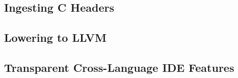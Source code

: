 \subsection{Ingesting C Headers}
\bigbreak \bigbreak \bigbreak
\bigbreak \bigbreak \bigbreak
\bigbreak \bigbreak \bigbreak
\bigbreak \bigbreak \bigbreak
\bigbreak \bigbreak \bigbreak
\bigbreak \bigbreak \bigbreak
\bigbreak \bigbreak \bigbreak
\bigbreak \bigbreak \bigbreak
\bigbreak \bigbreak \bigbreak
\bigbreak \bigbreak \bigbreak
\bigbreak \bigbreak \bigbreak
\bigbreak \bigbreak \bigbreak
\bigbreak \bigbreak \bigbreak
\bigbreak \bigbreak \bigbreak
\bigbreak \bigbreak \bigbreak
\bigbreak \bigbreak \bigbreak
\bigbreak \bigbreak \bigbreak
\bigbreak \bigbreak \bigbreak
\bigbreak \bigbreak \bigbreak
\bigbreak \bigbreak \bigbreak
\bigbreak \bigbreak \bigbreak
\bigbreak \bigbreak \bigbreak
\bigbreak \bigbreak \bigbreak
\bigbreak \bigbreak \bigbreak
\bigbreak \bigbreak \bigbreak
\bigbreak \bigbreak \bigbreak
\bigbreak \bigbreak \bigbreak
\bigbreak \bigbreak \bigbreak
\bigbreak \bigbreak \bigbreak

\subsection{Lowering to LLVM}

\bigbreak \bigbreak \bigbreak
\bigbreak \bigbreak \bigbreak
\bigbreak \bigbreak \bigbreak
\bigbreak \bigbreak \bigbreak
\bigbreak \bigbreak \bigbreak
\bigbreak \bigbreak \bigbreak
\bigbreak \bigbreak \bigbreak
\bigbreak \bigbreak \bigbreak
\bigbreak \bigbreak \bigbreak
\bigbreak \bigbreak \bigbreak
\bigbreak \bigbreak \bigbreak
\bigbreak \bigbreak \bigbreak
\bigbreak \bigbreak \bigbreak
\bigbreak \bigbreak \bigbreak
\bigbreak \bigbreak \bigbreak
\bigbreak \bigbreak \bigbreak
\bigbreak \bigbreak \bigbreak
\bigbreak \bigbreak \bigbreak
\bigbreak \bigbreak \bigbreak
\bigbreak \bigbreak \bigbreak
\bigbreak \bigbreak \bigbreak
\bigbreak \bigbreak \bigbreak
\bigbreak \bigbreak \bigbreak
\bigbreak \bigbreak \bigbreak
\bigbreak \bigbreak \bigbreak
\bigbreak \bigbreak \bigbreak
\bigbreak \bigbreak \bigbreak
\bigbreak \bigbreak \bigbreak
\bigbreak \bigbreak \bigbreak



\subsection{Transparent Cross-Language IDE Features}


